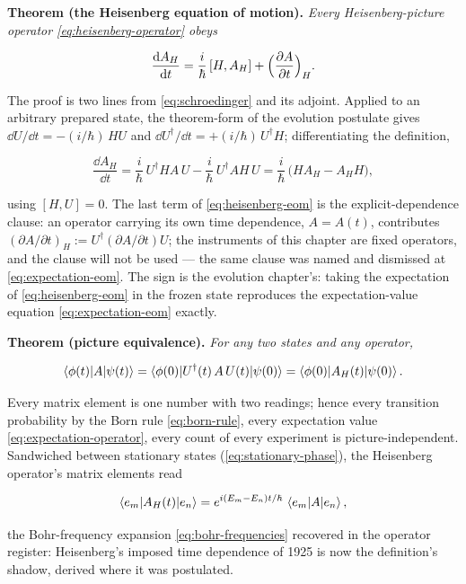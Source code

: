 \medskip\noindent\textbf{Theorem (the Heisenberg equation of motion).} \emph{Every Heisenberg-picture operator \eqref{eq:heisenberg-operator} obeys}
\begin{linenomath}
    \begin{equation}
        \frac{\mathrm{d} A_H}{\mathrm{d} t} = \frac{i}{\hbar}\,[H, A_H] + \Bigl(\frac{\partial A}{\partial t}\Bigr)_H .
        \label{eq:heisenberg-eom}
    \end{equation}
\end{linenomath}
The proof is two lines from \eqref{eq:schroedinger} and its adjoint. Applied to an arbitrary prepared state, the theorem-form of the evolution postulate gives $\dd U/\dd t = -(i/\hbar)\,HU$ and $\dd U^\dagger/\dd t = +(i/\hbar)\,U^\dagger H$; differentiating the definition,
\begin{linenomath}
    \begin{equation*}
        \frac{\dd A_H}{\dd t} = \frac{i}{\hbar}\,U^\dagger H A\,U - \frac{i}{\hbar}\,U^\dagger A H\,U = \frac{i}{\hbar}\,\bigl(HA_H - A_HH\bigr),
    \end{equation*}
\end{linenomath}
using $[H, U] = 0$. The last term of \eqref{eq:heisenberg-eom} is the explicit-dependence clause: an operator carrying its own time dependence, $A = A(t)$, contributes $(\partial A/\partial t)_H := U^\dagger(\partial A/\partial t)U$; the instruments of this chapter are fixed operators, and the clause will not be used --- the same clause was named and dismissed at \eqref{eq:expectation-eom}. The sign is the evolution chapter's: taking the expectation of \eqref{eq:heisenberg-eom} in the frozen state reproduces the expectation-value equation \eqref{eq:expectation-eom} exactly.

\medskip\noindent\textbf{Theorem (picture equivalence).} \emph{For any two states and any operator,}
\begin{linenomath}
    \begin{equation}
        \braket{\phi(t)|A|\psi(t)} = \braket{\phi(0)|U^\dagger(t)\,A\,U(t)|\psi(0)} = \braket{\phi(0)|A_H(t)|\psi(0)} .
        \label{eq:picture-invariance}
    \end{equation}
\end{linenomath}
Every matrix element is one number with two readings; hence every transition probability by the Born rule \eqref{eq:born-rule}, every expectation value \eqref{eq:expectation-operator}, every count of every experiment is picture-independent. Sandwiched between stationary states (\eqref{eq:stationary-phase}), the Heisenberg operator's matrix elements read
\begin{linenomath}
    \begin{equation*}
        \braket{e_m|A_H(t)|e_n} = e^{i(E_m - E_n)t/\hbar}\,\braket{e_m|A|e_n},
    \end{equation*}
\end{linenomath}
the Bohr-frequency expansion \eqref{eq:bohr-frequencies} recovered in the operator register: Heisenberg's imposed time dependence of 1925 is now the definition's shadow, derived where it was postulated.

